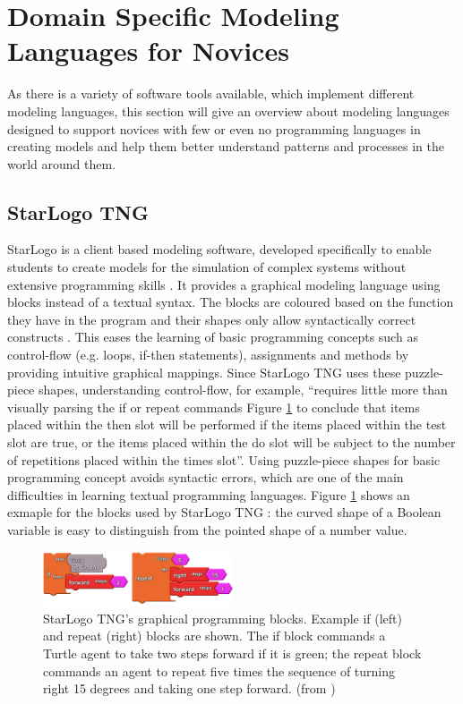 \documentclass[runningheads,a4paper]{llncs}
\begin{document}
 \section{Domain Specific Modeling Languages for Novices}
 As there is a variety of software tools available, which implement different modeling languages, this section will give an overview 
 about modeling languages designed to support novices with few or even no programming languages in creating models and help them better 
 understand patterns and processes in the world around them.
 
 \subsection{StarLogo TNG}
  StarLogo is a client based modeling software, developed specifically to enable students to 
  create models for the simulation of complex systems without extensive programming skills \cite{klopfer2009starlogo}.
  It provides a graphical modeling language using blocks instead of a textual syntax. 
  The blocks are coloured based on the function they have in the program and their shapes only allow syntactically correct constructs \cite{klopfer2009starlogo}.
  This eases the learning of basic programming concepts such as control-flow (e.g. loops, if-then statements),
  assignments and methods by providing intuitive graphical mappings. Since StarLogo TNG uses these puzzle-piece shapes, understanding 
  control-flow, for example, ``requires little more than visually parsing the if or repeat commands 
  Figure \ref{fig1} to conclude that items placed within the then slot will be performed if the items placed within the 
  test slot are true, or the items placed within the do slot will be subject to the number of repetitions placed within the times slot''\cite{smith2011biology}.
  Using puzzle-piece shapes for basic programming concept avoids syntactic errors, 
  which are one of the main difficulties in learning textual programming languages.
  Figure \ref{fig1} shows an exmaple for the blocks used by StarLogo TNG : 
  the curved shape of a Boolean variable is easy to distinguish from the pointed shape of a number value.
  
  \begin{figure}[H]
	\centering
  \includegraphics[width=0.5\textwidth]{images/StarLogoTNGBlocksEx.PNG}
	\caption{ StarLogo TNG’s graphical programming blocks. Example if (left) and repeat (right) blocks are shown. The
	  if block commands a Turtle agent to take two steps forward if it is green; the repeat block commands an agent to
	  repeat five times the sequence of turning right 15 degrees and taking one step forward. (from \cite{smith2011biology})}
	\label{fig1}
  \end{figure}
  
\end{document}

